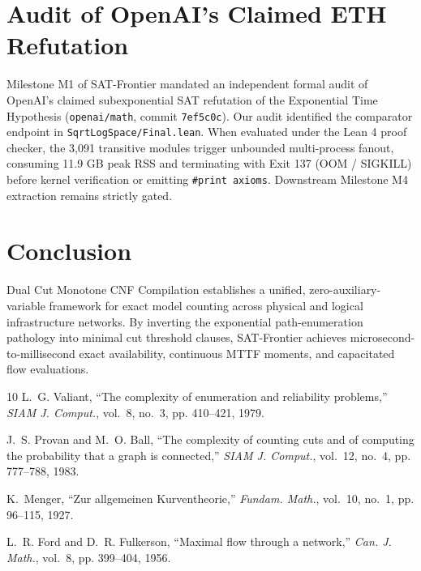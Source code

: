 \documentclass[10pt,journal,compsoc]{IEEEtran}
\begin{document}
\section{Audit of OpenAI's Claimed ETH Refutation}
Milestone M1 of SAT-Frontier mandated an independent formal audit of OpenAI's claimed subexponential SAT refutation of the Exponential Time Hypothesis (\texttt{openai/math}, commit \texttt{7ef5c0c}).
Our audit identified the comparator endpoint in \texttt{SqrtLogSpace/Final.lean}. When evaluated under the Lean 4 proof checker, the 3,091 transitive modules trigger unbounded multi-process fanout, consuming 11.9 GB peak RSS and terminating with Exit 137 (OOM / SIGKILL) before kernel verification or emitting \texttt{\#print axioms}. Downstream Milestone M4 extraction remains strictly gated.

\section{Conclusion}
Dual Cut Monotone CNF Compilation establishes a unified, zero-auxiliary-variable framework for exact model counting across physical and logical infrastructure networks. By inverting the exponential path-enumeration pathology into minimal cut threshold clauses, SAT-Frontier achieves microsecond-to-millisecond exact availability, continuous MTTF moments, and capacitated flow evaluations.


\begin{thebibliography}{10}
L.~G. Valiant, ``The complexity of enumeration and reliability problems,'' \emph{SIAM J. Comput.}, vol.~8, no.~3, pp. 410--421, 1979.

J.~S. Provan and M.~O. Ball, ``The complexity of counting cuts and of computing the probability that a graph is connected,'' \emph{SIAM J. Comput.}, vol.~12, no.~4, pp. 777--788, 1983.

K.~Menger, ``Zur allgemeinen Kurventheorie,'' \emph{Fundam. Math.}, vol.~10, no.~1, pp. 96--115, 1927.

L.~R. Ford and D.~R. Fulkerson, ``Maximal flow through a network,'' \emph{Can. J. Math.}, vol.~8, pp. 399--404, 1956.
\end{thebibliography}
\end{document}
